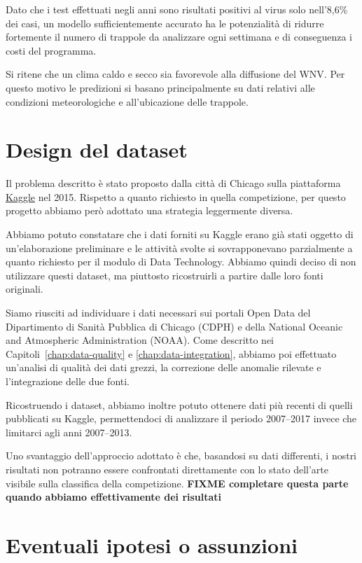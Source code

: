 Dato che i test effettuati negli anni sono risultati positivi al virus solo 
nell'8,6\% dei casi, un modello sufficientemente accurato ha le potenzialità di 
ridurre fortemente il numero di trappole da analizzare ogni settimana e di 
conseguenza i costi del programma. 


Si ritene che un clima caldo e secco sia favorevole alla diffusione del WNV. 
Per questo motivo le predizioni si basano principalmente su dati relativi alle 
condizioni meteorologiche e all'ubicazione delle trappole.

\section{Design del dataset}

Il problema descritto è stato proposto dalla città di Chicago sulla piattaforma 
\href{https://www.kaggle.com/c/predict-west-nile-virus}{Kaggle} nel 2015. 
Rispetto a quanto richiesto in quella competizione, per questo progetto abbiamo 
però adottato una strategia leggermente diversa.

Abbiamo potuto constatare che i dati forniti su Kaggle erano già stati oggetto 
di un'elaborazione preliminare e le attività svolte si sovrapponevano 
parzialmente a quanto richiesto per il modulo di Data Technology. Abbiamo 
quindi deciso di non utilizzare questi dataset, ma piuttosto ricostruirli a 
partire dalle loro fonti originali.

Siamo riusciti ad individuare i dati necessari sui portali Open Data del 
Dipartimento di Sanità Pubblica di Chicago (CDPH) e della National Oceanic and 
Atmospheric Administration (NOAA). Come descritto nei 
Capitoli~\ref{chap:data-quality} e \ref{chap:data-integration}, abbiamo poi 
effettuato un'analisi di qualità dei dati grezzi, la correzione delle anomalie 
rilevate e l'integrazione delle due fonti.

Ricostruendo i dataset, abbiamo inoltre potuto ottenere dati più recenti di 
quelli pubblicati su Kaggle, permettendoci di analizzare il periodo 2007--2017 
invece che limitarci agli anni 2007--2013.

Uno svantaggio dell'approccio adottato è che, basandosi su dati differenti, i 
nostri risultati non potranno essere confrontati direttamente con lo stato 
dell'arte visibile sulla classifica della competizione. \textbf{FIXME 
completare questa parte quando abbiamo effettivamente dei risultati}

\section{Eventuali ipotesi o assunzioni}

